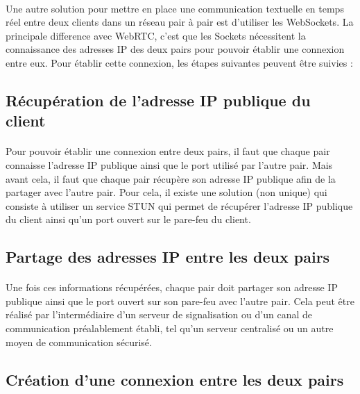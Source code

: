 \paragraph{}
Une autre solution pour mettre en place une communication textuelle en temps réel entre deux clients dans un réseau pair à pair est d'utiliser les WebSockets.
La principale difference avec WebRTC, c'est que les Sockets nécessitent la connaissance des adresses IP des deux pairs pour pouvoir établir une connexion entre eux.
Pour établir cette connexion, les étapes suivantes peuvent être suivies :

\subsection{Récupération de l'adresse IP publique du client}

\paragraph{}
Pour pouvoir établir une connexion entre deux pairs, il faut que chaque pair connaisse l'adresse IP publique ainsi que le port utilisé par l'autre pair. Mais avant cela, il faut que chaque pair récupère son adresse IP publique afin
de la partager avec l'autre pair. Pour cela, il existe une solution (non unique) qui consiste à utiliser un service STUN qui permet de récupérer l'adresse IP publique du client ainsi qu'un port ouvert sur le pare-feu du client.

\subsection{Partage des adresses IP entre les deux pairs}

\paragraph{}
Une fois ces informations récupérées, chaque pair doit partager son adresse IP publique ainsi que le port ouvert sur son pare-feu avec l'autre pair. Cela peut être réalisé par l'intermédiaire d'un serveur de signalisation 
ou d'un canal de communication préalablement établi, tel qu'un serveur centralisé ou un autre moyen de communication sécurisé.

\subsection{Création d'une connexion entre les deux pairs}

